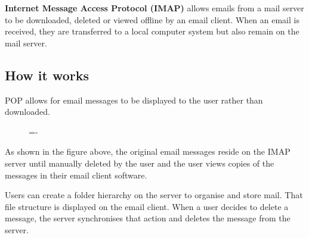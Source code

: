 \documentclass[a4paper]{systems-software}
\begin{document}
\textbf{Internet Message Access Protocol (IMAP)} allows emails from a mail server to be downloaded, deleted or viewed offline by an email client. When an email is received, they are transferred to a local computer system but also remain on the mail server.


\subsection*{How it works}

POP allows for email messages to be displayed to the user rather than downloaded.

\begin{figure}[H]
	\lineskip=-\fboxrule
\end{figure}

As shown in the figure above, the original email messages reside on the IMAP server until manually deleted by the user and the user views copies of the messages in their email client software.

Users can create a folder hierarchy on the server to organise and store mail. That file structure is displayed on the email client. When a user decides to delete a message, the server synchronises that action and deletes the message from the server.
\end{document}
